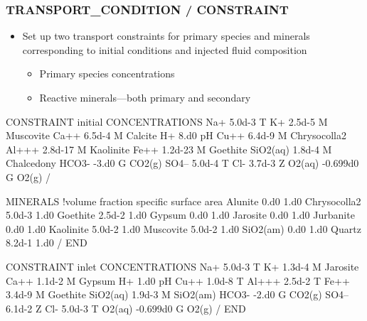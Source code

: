 \documentclass{beamer}
\begin{document}
\begin{frame}\frametitle{\bf TRANSPORT\_CONDITION / CONSTRAINT}

\begin{itemize}
  \item Set up two transport constraints for primary species and minerals corresponding to initial conditions and injected fluid composition
   \begin{itemize}
     \item Primary species concentrations
     \item Reactive minerals---both primary and secondary
   \end{itemize}
\end{itemize}

\newpage

\begin{semiverbatim}

CONSTRAINT initial
  CONCENTRATIONS
    Na+        5.0d-3   T
    K+         2.5d-5   M Muscovite
    Ca++       6.5d-4   M Calcite
    H+         8.d0    pH
    Cu++       6.4d-9   M Chrysocolla2
    Al+++      2.8d-17  M Kaolinite
    Fe++       1.2d-23  M Goethite
    SiO2(aq)   1.8d-4   M Chalcedony
    HCO3-      -3.d0    G CO2(g)
    SO4--      5.0d-4   T
    Cl-        3.7d-3   Z
    O2(aq)     -0.699d0 G O2(g)
  /
\end{semiverbatim}

  \newpage
\begin{semiverbatim}

  MINERALS !volume fraction specific surface area
    Alunite       0.d0    1.d0
    Chrysocolla2  5.0d-3  1.d0
    Goethite      2.5d-2  1.d0
    Gypsum        0.d0    1.d0
    Jarosite      0.d0    1.d0
    Jurbanite     0.d0    1.d0
    Kaolinite     5.0d-2  1.d0
    Muscovite     5.0d-2  1.d0
    SiO2(am)      0.d0    1.d0
    Quartz        8.2d-1  1.d0
  /
END
\end{semiverbatim}

\newpage
\begin{semiverbatim}
CONSTRAINT inlet
  CONCENTRATIONS
    Na+        5.0d-3   T
    K+         1.3d-4   M Jarosite
    Ca++       1.1d-2   M Gypsum
    H+         1.d0    pH
    Cu++       1.0d-8   T 
    Al+++      2.5d-2   T 
    Fe++       3.4d-9   M Goethite
    SiO2(aq)   1.9d-3   M SiO2(am)
    HCO3-      -2.d0    G CO2(g)
    SO4--      6.1d-2   Z
    Cl-        5.0d-3   T
    O2(aq)     -0.699d0 G O2(g)
  /
END
\end{semiverbatim}

\end{frame}
\end{document}
